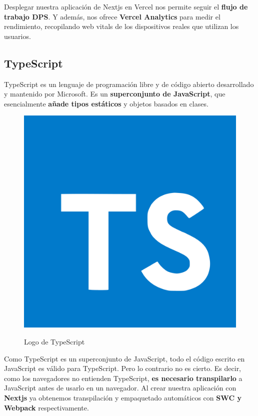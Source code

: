 \documentclass[12pt,twoside,titlepage]{report}
\begin{document}
Desplegar nuestra aplicación de Nextjs en Vercel nos permite seguir el \textbf{flujo de trabajo DPS}. Y además, nos ofrece \textbf{Vercel Analytics} para medir el rendimiento, recopilando web vitals de los dispositivos reales que utilizan los usuarios.

\subsection{TypeScript}

TypeScript es un lenguaje de programación libre y de código abierto desarrollado y mantenido por Microsoft. Es un \textbf{superconjunto de JavaScript}, que esencialmente \textbf{añade tipos estáticos} y objetos basados en clases.

\begin{figure}[H]
    \centering
    \includegraphics[scale=0.03]{TypeScript/TypeScript}
    \label{fig:TypeScriptLogo}
    \caption{Logo de TypeScript}
\end{figure}

Como TypeScript es un superconjunto de JavaScript, todo el código escrito en JavaScript es válido para TypeScript. Pero lo contrario no es cierto. Es decir, como los navegadores no entienden TypeScript, \textbf{es necesario transpilarlo} a JavaScript antes de usarlo en un navegador. Al crear nuestra aplicación con \textbf{Nextjs} ya obtenemos transpilación y empaquetado automáticos con \textbf{SWC y Webpack} respectivamente.
\end{document}
